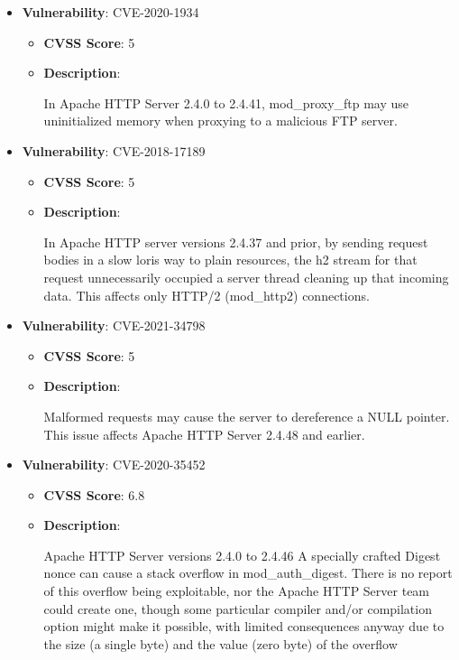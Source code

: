 \documentclass{article}
\begin{document}
\begin{itemize}
        \item \textbf{Vulnerability}: CVE-2020-1934
        \begin{itemize}
            \item \textbf{CVSS Score}:  5 
            \item \textbf{Description}:
            \parbox[t]{0.9\linewidth}{
                \ttfamily In Apache HTTP Server 2.4.0 to 2.4.41, mod\_proxy\_ftp may use uninitialized memory when proxying to a malicious FTP server.
            }
        \end{itemize}
    
        \item \textbf{Vulnerability}: CVE-2018-17189
        \begin{itemize}
            \item \textbf{CVSS Score}:  5 
            \item \textbf{Description}:
            \parbox[t]{0.9\linewidth}{
                \ttfamily In Apache HTTP server versions 2.4.37 and prior, by sending request bodies in a slow loris way to plain resources, the h2 stream for that request unnecessarily occupied a server thread cleaning up that incoming data. This affects only HTTP/2 (mod\_http2) connections.
            }
        \end{itemize}
    
        \item \textbf{Vulnerability}: CVE-2021-34798
        \begin{itemize}
            \item \textbf{CVSS Score}:  5 
            \item \textbf{Description}:
            \parbox[t]{0.9\linewidth}{
                \ttfamily Malformed requests may cause the server to dereference a NULL pointer. This issue affects Apache HTTP Server 2.4.48 and earlier.
            }
        \end{itemize}
    
        \item \textbf{Vulnerability}: CVE-2020-35452
        \begin{itemize}
            \item \textbf{CVSS Score}:  6.8 
            \item \textbf{Description}:
            \parbox[t]{0.9\linewidth}{
                \ttfamily Apache HTTP Server versions 2.4.0 to 2.4.46 A specially crafted Digest nonce can cause a stack overflow in mod\_auth\_digest. There is no report of this overflow being exploitable, nor the Apache HTTP Server team could create one, though some particular compiler and/or compilation option might make it possible, with limited consequences anyway due to the size (a single byte) and the value (zero byte) of the overflow
            }
        \end{itemize}
    

\end{itemize}
\end{document}
